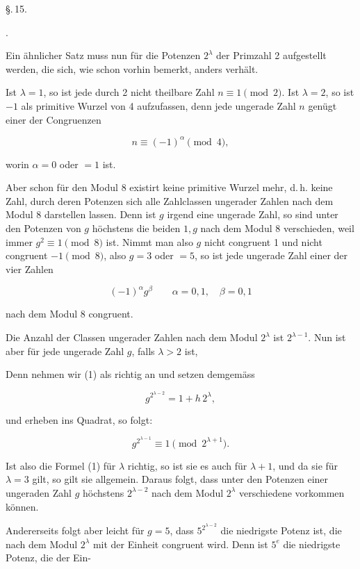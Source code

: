 
\begin{center}
\S.\,15.

.
\end{center}

Ein ähnlicher Satz muss nun für die Potenzen $2^\lambda$ der Primzahl 2 aufgestellt werden, die sich, wie schon vorhin bemerkt, anders verhält.

Ist $\lambda = 1$, so ist jede durch 2 nicht theilbare Zahl $n \equiv 1 \pmod{2}$. Ist $\lambda = 2$, so ist $-1$ als primitive Wurzel von 4 aufzufassen, denn jede ungerade Zahl $n$ genügt einer der Congruenzen

\[
n \equiv (-1)^\alpha \pmod{4},
\]

worin $\alpha = 0$ oder $= 1$ ist.

Aber schon für den Modul 8 existirt keine primitive Wurzel mehr, d.\,h. keine Zahl, durch deren Potenzen sich alle Zahlclassen ungerader Zahlen nach dem Modul 8 darstellen lassen. Denn ist $g$ irgend eine ungerade Zahl, so sind unter den Potenzen von $g$ höchstens die beiden $1, g$ nach dem Modul 8 verschieden, weil immer $g^2 \equiv 1 \pmod{8}$ ist. Nimmt man also $g$ nicht congruent 1 und nicht congruent $-1 \pmod{8}$, also $g = 3$ oder $= 5$, so ist jede ungerade Zahl einer der vier Zahlen

\[
(-1)^\alpha g^\beta \qquad \alpha = 0, 1, \quad \beta = 0, 1
\]

nach dem Modul 8 congruent.

Die Anzahl der Classen ungerader Zahlen nach dem Modul $2^\lambda$ ist $2^{\lambda-1}$. Nun ist aber für jede ungerade Zahl $g$, falls $\lambda > 2$ ist,


Denn nehmen wir (1) als richtig an und setzen demgemäss

\[
g^{2^{\lambda-2}} = 1 + h\, 2^\lambda,
\]

und erheben ins Quadrat, so folgt:

\[
g^{2^{\lambda-1}} \equiv 1 \pmod{2^{\lambda+1}}.
\]

Ist also die Formel (1) für $\lambda$ richtig, so ist sie es auch für $\lambda + 1$, und da sie für $\lambda = 3$ gilt, so gilt sie allgemein. Daraus folgt, dass unter den Potenzen einer ungeraden Zahl $g$ höchstens $2^{\lambda-2}$ nach dem Modul $2^\lambda$ verschiedene vorkommen können.

Andererseits folgt aber leicht für $g = 5$, dass $5^{2^{\lambda-2}}$ die niedrigste Potenz ist, die nach dem Modul $2^\lambda$ mit der Einheit congruent wird. Denn ist $5^e$ die niedrigste Potenz, die der Ein-
